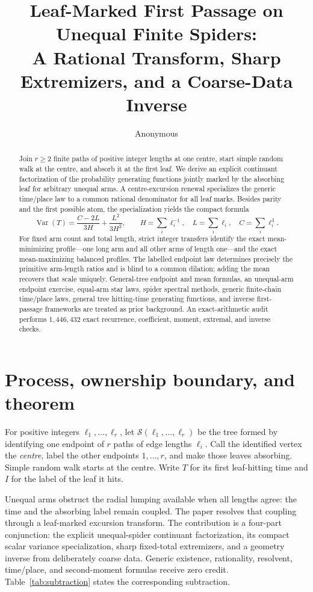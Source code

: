 \documentclass[a4paper,10pt]{amsart}
\title[First passage on unequal finite spiders]{Leaf-Marked First Passage on Unequal Finite Spiders:\\
A Rational Transform, Sharp Extremizers, and a Coarse-Data Inverse}
\author{Anonymous}
\date{}
\theoremstyle{remark}
\newcommand{\cS}{\mathcal S}
\begin{document}
\begin{abstract}
Join $r\ge2$ finite paths of positive integer lengths at one centre, start
simple random walk at the centre, and absorb it at the first leaf.  We derive
an explicit continuant factorization of the probability generating functions
jointly marked by the absorbing leaf for arbitrary unequal arms.  A
centre-excursion renewal specializes the generic time/place law to a common
rational denominator for all leaf marks.  Besides parity and the first
possible atom, the specialization yields the compact formula
\[
 \operatorname{Var}(T)=\frac{C-2L}{3H}+\frac{L^2}{3H^2},
 \qquad
 H=\sum_i\ell_i^{-1},\quad L=\sum_i\ell_i,\quad C=\sum_i\ell_i^3.
\]
For fixed arm count and total length, strict integer transfers identify the
exact mean-minimizing profile---one long arm and all other arms of length
one---and the exact mean-maximizing balanced profiles.  The labelled endpoint
law determines precisely the primitive arm-length ratios and is blind to a
common dilation; adding the mean recovers that scale uniquely.  General-tree
endpoint and mean formulas, an unequal-arm endpoint exercise, equal-arm star
laws, spider spectral methods, generic finite-chain time/place laws, general
tree hitting-time generating functions, and inverse first-passage frameworks
are treated as prior background.  An exact-arithmetic audit performs
$1{,}446{,}432$ exact recurrence, coefficient, moment, extremal, and inverse
checks.
\end{abstract}

\maketitle

\section{Process, ownership boundary, and theorem}\label{sec:setup}

For positive integers $\ell_1,\ldots,\ell_r$, let
$\cS(\ell_1,\ldots,\ell_r)$ be the tree formed by identifying one endpoint
of $r$ paths of edge lengths $\ell_i$.  Call the identified vertex the
\emph{centre}, label the other endpoints $1,\ldots,r$, and make those leaves
absorbing.  Simple random walk starts at the centre.  Write $T$ for its first
leaf-hitting time and $I$ for the label of the leaf it hits.

Unequal arms obstruct the radial lumping available when all lengths agree:
the time and the absorbing label remain coupled.  The paper resolves that
coupling through a leaf-marked excursion transform.  The contribution is a
four-part conjunction: the explicit unequal-spider continuant factorization,
its compact scalar variance specialization, sharp fixed-total extremizers,
and a geometry inverse from deliberately coarse data.  Generic existence,
rationality, resolvent, time/place, and second-moment formulas receive zero
credit.  Table~\ref{tab:subtraction} states the corresponding subtraction.
\end{document}
